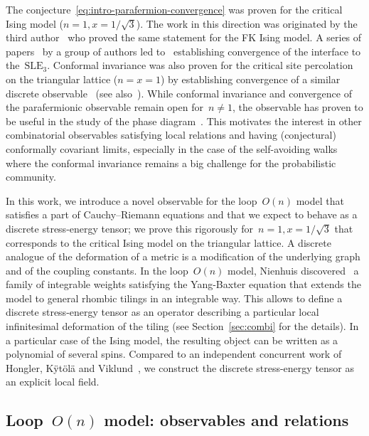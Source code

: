 \documentclass[reqno,11pt,a4paper]{amsart}
\theoremstyle{remark}
\newcommand{\sle}{\mathrm{SLE}}
\begin{document}
The conjecture~\eqref{eq:intro-parafermion-convergence} was proven for the critical Ising model ($n=1,x=1/\sqrt{3}$).
The work in this direction was originated by the third author~\cite{Smi10} who proved the same statement for the FK Ising model.
A series of papers~\cite{CheSmi11,CheSmi12,DumHonNol11,KemSmi12} by a group of authors led to~\cite{CheDumHonKemSmi14}
establishing convergence of the interface to the~$\sle_3$.
Conformal invariance was also proven for the critical site percolation on the triangular lattice ($n=x=1$) by establishing convergence of a similar discrete observable~\cite{Smi01,CamNew06} (see also~\cite{KhrSmi21}).
While conformal invariance and convergence of the parafermionic observable remain open for~$n\neq 1$,
the observable has proven to be useful in the study of the phase diagram~\cite{DumSmi12,DumGlaPel21}.
This motivates the interest in other combinatorial observables satisfying local relations
and having (conjectural) conformally covariant limits, especially in the case of the self-avoiding walks where
the conformal invariance remains a big challenge for the probabilistic community.

In this work, we introduce a novel observable for the loop~$O(n)$ model that satisfies a part of Cauchy--Riemann equations and that we expect to behave as a discrete stress-energy tensor; we prove this rigorously for~$n=1,x=1/\sqrt{3}$ that corresponds to the critical Ising model on the triangular lattice.
A discrete analogue of the deformation of a metric is a modification of the underlying graph and of the coupling constants. 
In the loop~$O(n)$ model, Nienhuis discovered~\cite{Nie90} a family of integrable weights satisfying the Yang-Baxter equation that extends the model to general rhombic tilings in an integrable way.
This allows to define a discrete stress-energy tensor as an operator describing a particular local infinitesimal deformation of the tiling (see Section~\ref{sec:combi} for the details).
In a particular case of the Ising model, the resulting object can be written as a polynomial of several spins.
Compared to an independent concurrent work of Hongler, K{\"y}t{\"o}l{\"a} and Viklund~\cite{HonKytVik22}, we construct the discrete stress-energy tensor as an explicit local field.


\subsection{Loop~$O(n)$ model: observables and relations}
\label{sub:results-o-n}
\end{document}

